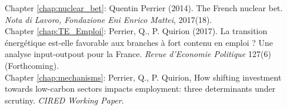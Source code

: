 

Chapter \ref{chap:nuclear_bet}: Quentin Perrier (2014). The French nuclear bet. {\itshape Nota di Lavoro, Fondazione Eni Enrico Mattei}, 2017(18).\\


Chapter \ref{chap:TE_Emploi}: Perrier, Q., P. Quirion (2017). La transition énergétique est-elle
favorable aux branches à fort contenu en emploi ? Une analyse input-outpout pour la France. {\itshape Revue d'Economie Politique} 127(6) (Forthcoming).\\

Chapter \ref{chap:mechanisms}: Perrier, Q., P. Quirion, How shifting investment towards low-carbon sectors impacts employment: three determinants under scrutiny. {\itshape CIRED Working Paper}.\\


